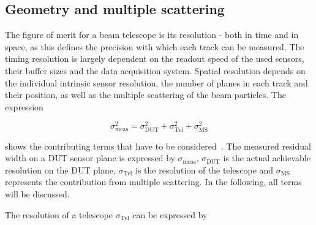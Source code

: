 
\subsection{Geometry and multiple scattering}

The figure of merit for a beam telescope is its resolution  - both in time and in space, as this defines the precision with which each track can be measured. 
The timing resolution is largely dependent on the readout speed of the used sensors, their buffer sizes and the data acquisition system. 
Spatial resolution depends on the individual intrinsic sensor resolution, the number of planes in each track and their position, as well as the multiple scattering of the beam particles. 
The expression

\begin{equation}
\label{eq:telescoperesolutionequation}
\sigma_{\textrm{meas}}^2 = \sigma_{\textrm{DUT}}^2 + \sigma_{\textrm{Tel}}^2 +
\sigma_{\textrm{MS}}^2
\end{equation}

\noindent shows the contributing terms that have to be considered~\cite{ref:eudetreport200902}. 
The measured residual width on a DUT sensor plane is expressed by $\sigma_{\textrm{meas}}$, $\sigma_{\textrm{DUT}}$ is the actual achievable resolution on the DUT plane,
 $\sigma_{\textrm{Tel}}$ is the resolution of the telescope and $\sigma_{\textrm{MS}}$ represents the contribution from multiple scattering.
In the following, all terms will be discussed.

The resolution of a telescope $\sigma_{\textrm{Tel}}$ can be expressed by

